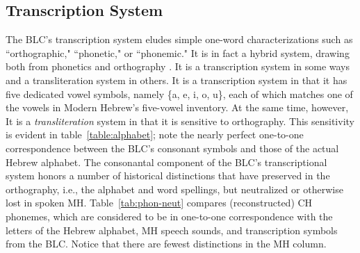\subsection{Transcription System}\label{sec:transcription}
The \ac{BLC}'s transcription system eludes simple one-word characterizations 
such as ``orthographic,"
``phonetic," or ``phonemic." It is in fact a hybrid system, drawing
both from phonetics and orthography \citep{albert-et-al:2013}. It is a transcription system
in some ways and a transliteration system in others.
It is a transcription system in that it has five dedicated vowel symbols, 
namely \{a, e, i, o, u\}, each of which matches one of the vowels in Modern 
Hebrew's five-vowel inventory. %
At the same time, however, 
It is a \emph{transliteration} system in that it is sensitive to orthography. This sensitivity is evident in 
table~\ref{table:alphabet}; note the nearly perfect one-to-one correspondence between the \ac{BLC}'s consonant 
symbols and those of the actual Hebrew alphabet. The consonantal component of the \ac{BLC}'s transcriptional system 
honors a number of historical distinctions that have preserved in the orthography, i.e., the alphabet and word 
spellings, but neutralized or otherwise lost in spoken \ac{MH}. Table~\ref{tab:phon-neut} compares 
(reconstructed) \ac{CH} phonemes, which are considered to be in one-to-one correspondence with the letters of 
the Hebrew alphabet, \ac{MH} speech sounds, and transcription symbols from the \ac{BLC}. Notice that there are fewest distinctions
in the \ac{MH} column.





